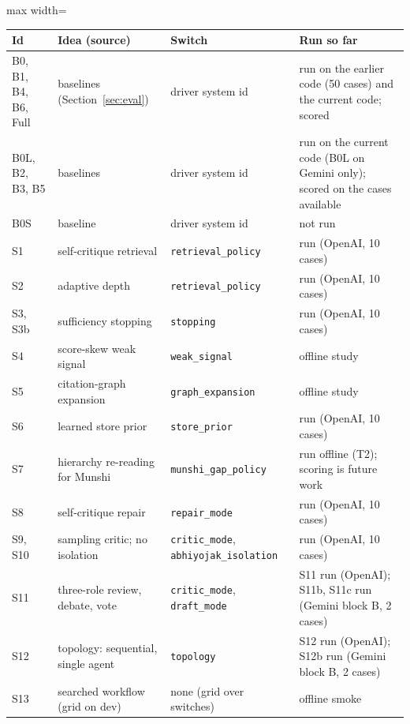 \begin{table}[H]
\centering\small\setlength\tabcolsep{3pt}
\begin{adjustbox}{max width=\textwidth}
\begin{tabular}{@{}lp{5.2cm}p{3.5cm}l@{}}
\toprule
Id & Idea (source) & Switch & Run so far \\
\midrule
B0, B1, B4, B6, Full & baselines (Section~\ref{sec:eval}) & driver system id & run on the earlier code (50 cases) and the current code; scored \\
B0L, B2, B3, B5 & baselines & driver system id & run on the current code (B0L on Gemini only); scored on the cases available\\ B0S & baseline & driver system id & not run \\
S1 & self-critique retrieval \citep{asai2024selfrag,yan2024crag} & \texttt{retrieval\_policy} & run (OpenAI, 10 cases) \\
S2 & adaptive depth \citep{jeong2024adaptive} & \texttt{retrieval\_policy} & run (OpenAI, 10 cases) \\
S3, S3b & sufficiency stopping \citep{joren2025sufficient} & \texttt{stopping} & run (OpenAI, 10 cases) \\
S4 & score-skew weak signal & \texttt{weak\_signal} & offline study \\
S5 & citation-graph expansion \citep{gutierrez2025hipporag2} & \texttt{graph\_expansion} & offline study \\
S6 & learned store prior \citep{zhang2026agentrouter} & \texttt{store\_prior} & run (OpenAI, 10 cases) \\
S7 & hierarchy re-reading for Munshi & \texttt{munshi\_gap\_policy} & run offline (T2); scoring is future work \\
S8 & self-critique repair \citep{gou2024critic,huang2024selfcorrect} & \texttt{repair\_mode} & run (OpenAI, 10 cases) \\
S9, S10 & sampling critic; no isolation \citep{choi2025debate,wynn2025talk} & \texttt{critic\_mode}, \texttt{abhiyojak\_isolation} & run (OpenAI, 10 cases) \\
S11 & three-role review, debate, vote \citep{kumar2025courtevel} & \texttt{critic\_mode}, \texttt{draft\_mode} & S11 run (OpenAI); S11b, S11c run (Gemini block B, 2 cases) \\
S12 & topology: sequential, single agent \citep{cemri2025mast} & \texttt{topology} & S12 run (OpenAI); S12b run (Gemini block B, 2 cases) \\
S13 & searched workflow (grid on dev) & none (grid over switches) & offline smoke \\

\end{tabular}
\end{adjustbox}
\end{table}
